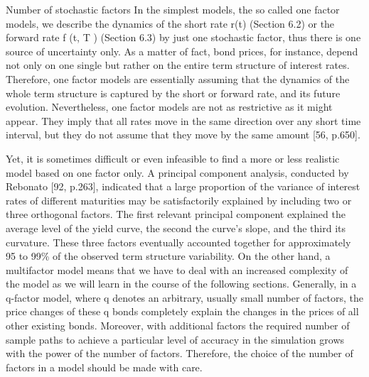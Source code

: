 Number of stochastic factors
In the simplest models, the so called one factor models, we describe the 
dynamics of the short rate r(t) (Section 6.2) or the forward 
rate f (t, T ) (Section 6.3) by just one stochastic factor, thus there 
is one source of uncertainty only. As a matter of fact, bond prices, 
for instance, depend not only on one single but rather on the entire 
term structure of interest rates. Therefore, one factor models are 
essentially assuming that the dynamics of the whole term structure is 
captured by the short or forward rate, and its future evolution. Nevertheless, 
one factor models are not as restrictive as it might appear. They imply 
that all rates move in the same direction over any short time interval, 
but they do not assume that they move by the same amount [56, p.650].

Yet, it is sometimes difficult or even infeasible to find a more or less 
realistic model based on one factor only. A principal component analysis, 
conducted by Rebonato [92, p.263], indicated that a large proportion of 
the variance of interest rates of different maturities may be satisfactorily 
explained by including two or three orthogonal factors. The first relevant 
principal component explained the average level of the yield curve, the 
second the curve’s slope, and the third its curvature. These three factors 
eventually accounted together for approximately 95 to 99\% of the observed 
term structure variability.
On the other hand, a multifactor model means that we have to deal with an 
increased complexity of the model as we will learn in the course of the 
following sections. Generally, in a q-factor model, where q denotes an 
arbitrary, usually small number of factors, the price changes of 
these q bonds completely explain the changes in the prices of all 
other existing bonds. Moreover, with additional factors the required 
number of sample paths to achieve a particular level of accuracy in the 
simulation grows with the power of the number of factors. 
Therefore, the choice of the number of factors in a model should be made with care.

